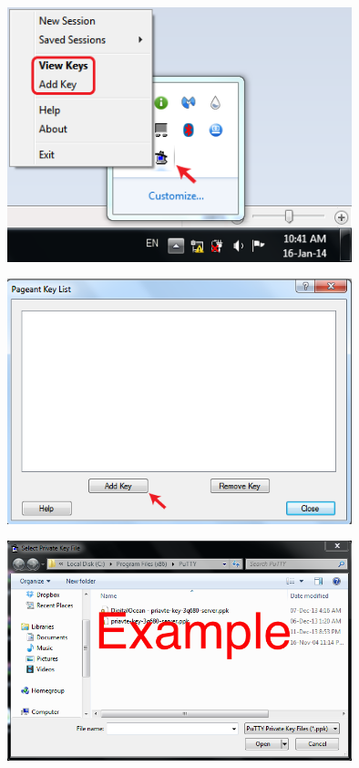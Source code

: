 \begin{figure}
  \includegraphics[width=10cm]{Images/example18.png}
  \centering
\end{figure}
\vspace{5 mm}

\begin{figure}
  \includegraphics[width=10cm]{Images/example19.png}
  \centering
\end{figure}
\vspace{5 mm}

\begin{figure}
  \includegraphics[width=10cm]{Images/example20.png}
  \centering
\end{figure}
\vspace{5 mm}

